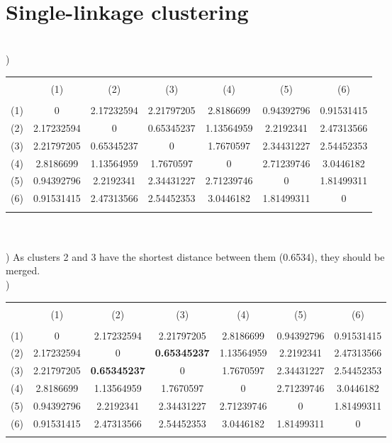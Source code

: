 \documentclass[12pt]{article}
\begin{document}
\noindent \hrulefill \\\pagebreak


\section{Single-linkage clustering}\ \\


) 
\begin{tabular}{ccccccc}
\hhline{-------}\\[-1em]
 & (1) & (2) & (3) & (4) & (5) & (6)\\[.2em]
\hhline{-------}\\[-1em]
(1) & 0 & 2.17232594 & 2.21797205 & 2.8186699  & 0.94392796 & 0.91531415 \\
(2) & 2.17232594 & 0 & 0.65345237 & 1.13564959 & 2.2192341  & 2.47313566 \\
(3) & 2.21797205 & 0.65345237 & 0 & 1.7670597 & 2.34431227 & 2.54452353 \\
(4) & 2.8186699 & 1.13564959 & 1.7670597 & 0 & 2.71239746 & 3.0446182 \\
(5) & 0.94392796 & 2.2192341 & 2.34431227 & 2.71239746 & 0 & 1.81499311\\
(6) & 0.91531415 & 2.47313566 & 2.54452353 & 3.0446182 & 1.81499311 & 0\\
\hhline{-------}
\end{tabular}\\\\



) As clusters 2 and 3 have the shortest distance between them (0.6534), they should be\\
\indent merged.\\



) 
\begin{tabular}{ccccccc}
\hhline{-------}\\[-1em]
 & (1) & (2) & (3) & (4) & (5) & (6)\\[.2em]
\hhline{-------}\\[-1em]
(1) & 0 & 2.17232594 & 2.21797205 & 2.8186699  & 0.94392796 & 0.91531415 \\
(2) & 2.17232594 & 0 & \textbf{0.65345237} & 1.13564959 & 2.2192341  & 2.47313566 \\
(3) & 2.21797205 & \textbf{0.65345237} & 0 & 1.7670597 & 2.34431227 & 2.54452353 \\
(4) & 2.8186699 & 1.13564959 & 1.7670597 & 0 & 2.71239746 & 3.0446182 \\
(5) & 0.94392796 & 2.2192341 & 2.34431227 & 2.71239746 & 0 & 1.81499311\\
(6) & 0.91531415 & 2.47313566 & 2.54452353 & 3.0446182 & 1.81499311 & 0\\
\hhline{-------}
\end{tabular}\\\\
\end{document}
